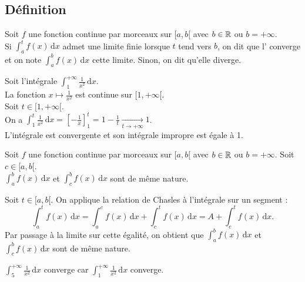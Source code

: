 \documentclass{book}
\begin{document}
\subsection{Définition}
\begin{Definition}[Intégrale impropre sur $[a,b[$]
Soit $f$ une fonction continue par morceaux sur $[a,b [$ avec $b \in \mathbb{R}$ ou $b = +\infty$.\\
Si $\int_a^t f(x) \,\mathrm dx$ admet une limite finie lorsque $t$ tend vers $b$, on dit que l' converge et on
note $\int_a^b f(x) \,\mathrm dx$ cette limite. Sinon, on dit qu'elle diverge.
\end{Definition}
\begin{Exemple}
Soit l'intégrale $\int_1^{+\infty } \frac{1}{x^2}\,\mathrm dx$.\\
La fonction $ x\mapsto  \frac{1}{x^2}$ est continue sur $[1,{+\infty }[$.\\ 
Soit $t\in [1,{+\infty }[$.\\
On a  $\int_1^t \frac{1}{x^2}\,\mathrm dx=[-\frac 1 x]_1^t=1-\frac{1}{t}\xrightarrow[t\to+\infty ]{}1$.\\
L'intégrale est convergente et son intégrale impropre est égale à 1.
\end{Exemple}
\begin{Proposition}
Soit $f$ une fonction continue par morceaux sur $[a,b [$ avec $b \in \mathbb{R}$ ou $b = +\infty$. Soit $c\in[a,b[$.\\
$\int_a^b f(x) \,\mathrm dx$ et $\int_c^b f(x) \,\mathrm dx$ sont de même nature.
\end{Proposition}
\begin{Demonstration}
Soit $t\in[a,b[$. On applique la relation de Chasles à l'intégrale sur un segment :
$$ \int_a^t f(x) \,\mathrm dx = \int_a^c f(x) \,\mathrm dx+\int_c^t f(x) \,\mathrm dx=A+\int_c^t f(x) \,\mathrm dx.$$
Par passage à la limite sur cette égalité, on obtient que $\int_a^b f(x) \,\mathrm dx$ et $\int_c^b f(x) \,\mathrm dx$ sont de même nature.
\end{Demonstration}
\begin{Exemple}
$\int_5^{+\infty } \frac{1}{x^2}\,\mathrm dx$ converge car $\int_1^{+\infty } \frac{1}{x^2}\,\mathrm dx$ converge.
\end{Exemple}
\end{document}
